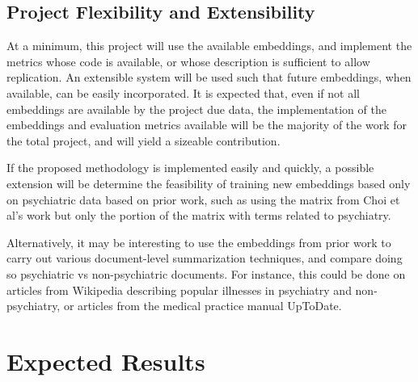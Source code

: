 \documentclass[10pt]{article}
\begin{document}
\begin{itemize}
\subsection{Project Flexibility and Extensibility}

At a minimum, this project will use the available embeddings, and implement the metrics whose code is available, or whose description is sufficient to allow replication. An extensible system will be used such that future embeddings, when available, can be easily incorporated. It is expected that, even if not all embeddings are available by the project due data, the implementation of the embeddings and evaluation metrics available will be the majority of the work for the total project, and will yield a sizeable contribution. 

If the proposed methodology is implemented easily and quickly, a possible extension will be determine the feasibility of training new embeddings based only on psychiatric data based on prior work, such as using the matrix from Choi et al's work  but only the portion of the matrix with terms related to psychiatry. 

Alternatively, it may be interesting to use the embeddings from prior work to carry out various document-level summarization techniques, and compare doing so psychiatric vs non-psychiatric documents. For instance, this could be done on articles from Wikipedia describing popular illnesses in psychiatry and non-psychiatry, or articles from the medical practice manual UpToDate.

\end{itemize}

\section{Expected Results}
\end{document}
